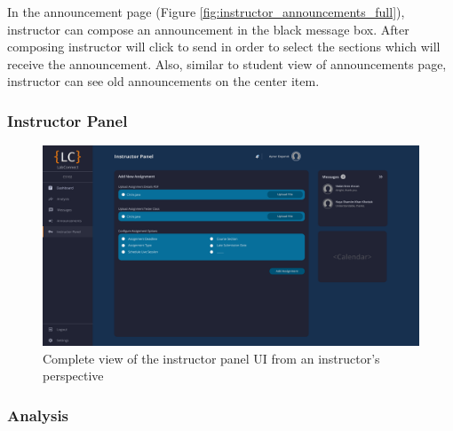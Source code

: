 \documentclass[a4paper, 12pt]{article}
\begin{document}
    In the announcement page (Figure \ref{fig:instructor_announcements_full}), instructor can compose an announcement in the black message box. After composing instructor will click to send 
    in order to select the sections which will receive the announcement. Also, similar to student view of announcements page, instructor can see old announcements on the center item.
    
    
    
    \pagebreak
    
    \subsubsection{Instructor Panel}
    
    \begin{figure}[H]
        \centering
        \includegraphics[width=\textwidth]{instructor_admin_panel}
        \caption{Complete view of the instructor panel UI from an instructor's perspective}
        \label{fig:instructor_admin_panel_full}
    \end{figure}
    
    
    
    
    
    
    
    
    
    
    
    
    
    \pagebreak
    
    \subsubsection{Analysis}
    
\end{document}
